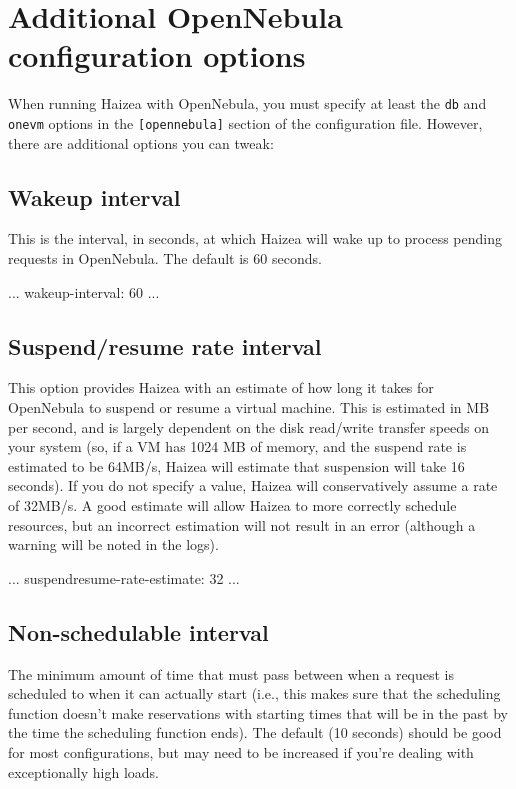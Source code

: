 \section{Additional OpenNebula configuration options}

When running Haizea with OpenNebula, you must specify at least the \texttt{db} and \texttt{onevm} options in the \texttt{[opennebula]} section of the configuration file. However, there are additional options you can tweak:

\subsection{Wakeup interval}

This is the interval, in seconds, at which Haizea will wake up to process pending requests in OpenNebula. The default is 60 seconds.

\begin{wideshellverbatim}
[opennebula]
...
wakeup-interval: 60
...
\end{wideshellverbatim}

\subsection{Suspend/resume rate interval}

This option provides Haizea with an estimate of how long it takes for OpenNebula to suspend or resume a virtual machine. This is estimated in MB per second, and is largely dependent on the disk read/write transfer speeds on your system (so, if a VM has 1024 MB of memory, and the suspend rate is estimated to be 64MB/s, Haizea will estimate that suspension will take 16 seconds). If you do not specify a value, Haizea will conservatively assume a rate of 32MB/s. A good estimate will allow Haizea to more correctly schedule resources, but an incorrect estimation will not result in an error (although a warning will be noted in the logs).

\begin{wideshellverbatim}
[opennebula]
...
suspendresume-rate-estimate: 32
...
\end{wideshellverbatim}

\subsection{Non-schedulable interval}

The minimum amount of time that must pass between when a request is scheduled to when it can actually start (i.e., this makes sure that the scheduling function doesn't make reservations with starting times that will be in the past by the time the scheduling function ends). The default (10 seconds) should be good for most configurations, but may need to be increased if you're dealing with exceptionally high loads.

